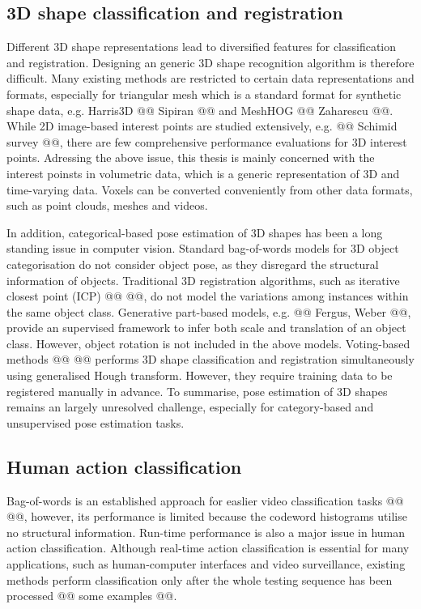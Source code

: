\subsection{3D shape classification and registration} 

Different 3D shape representations lead to diversified features for classification and registration. Designing an generic 3D shape recognition algorithm is therefore difficult. Many existing methods are restricted to certain data representations and formats, especially for triangular mesh which is a standard format for synthetic shape data, e.g. Harris3D @@ Sipiran @@ and MeshHOG @@ Zaharescu @@.     
While 2D image-based interest points are studied extensively, e.g. @@ Schimid survey @@, there are few comprehensive performance evaluations for 3D interest points. 
Adressing the above issue, this thesis is mainly concerned with the interest poinsts in volumetric data, which is a generic representation of 3D and time-varying data. Voxels can be converted conveniently from other data formats, such as point clouds, meshes and videos. 

In addition, categorical-based pose estimation of 3D shapes has been a long standing issue in computer vision.
Standard bag-of-words models for 3D object categorisation do not consider object pose, as they disregard the structural information of objects. Traditional 3D registration algorithms, such as iterative closest point (ICP) @@ @@, do not model the variations among instances within the same object class. 
Generative part-based models, e.g. @@ Fergus, Weber @@, provide an supervised framework to infer both scale and translation of an object class. However, object rotation is not included in the above models. 
Voting-based methods @@ @@ performs 3D shape classification and registration simultaneously using generalised Hough transform. However, they require training data to be registered manually in advance.  
To summarise, pose estimation of 3D shapes remains an largely unresolved challenge, especially for category-based and unsupervised pose estimation tasks.  

\subsection{Human action classification}


Bag-of-words is an established approach for easlier video classification tasks @@ @@, however, its performance is limited because the codeword histograms utilise no structural information. Run-time performance is also a major issue in human action classification. Although real-time action classification is essential for many applications, such as human-computer interfaces and video surveillance, existing methods perform classification only after the whole testing sequence has been processed @@ some examples @@. 

